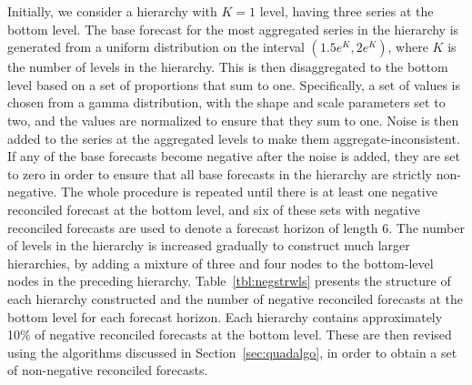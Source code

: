 \documentclass[11pt]{article}
\newcommand{\0}{\phantom{0}}
\begin{document}
Initially, we consider a hierarchy with $K=1$ level, having three series at the bottom level. The base forecast for the most aggregated series in the hierarchy is generated from a uniform distribution on the interval $(1.5e^{K}, 2e^{K})$, where $K$ is the number of levels in the hierarchy. This is then disaggregated to the bottom level based on a set of proportions that sum to one. Specifically, a set of values is chosen from a gamma distribution, with the shape and scale parameters set to two, and the values are normalized to ensure that they sum to one. Noise is then added to the series at the aggregated levels to make them aggregate-inconsistent. If any of the base forecasts become negative after the noise is added, they are set to zero in order to ensure that all base forecasts in the hierarchy are strictly non-negative. The whole procedure is repeated until there is at least one negative reconciled forecast at the bottom level, and six of these sets with negative reconciled forecasts are used to denote a forecast horizon of length 6. The number of levels in the hierarchy is increased gradually to construct much larger hierarchies, by adding a mixture of three and four nodes to the bottom-level nodes in the preceding hierarchy. Table~\ref{tbl:negstrwls} presents the structure of each hierarchy constructed and the number of negative reconciled forecasts at the bottom level for each forecast horizon. Each hierarchy contains approximately 10\% of negative reconciled forecasts at the bottom level. These are then revised using the algorithms discussed in Section~\ref{sec:quadalgo}, in order to obtain a set of non-negative reconciled forecasts. 
\end{document}
